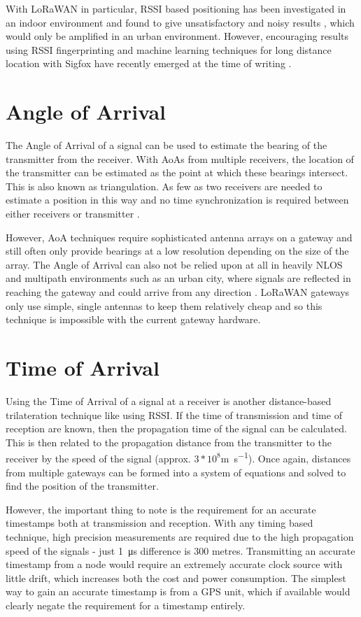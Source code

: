 \documentclass[a4paper]{report}
\begin{document}
    With LoRaWAN in particular, RSSI based positioning has been investigated in an indoor environment and found to give unsatisfactory and noisy results \cite{Henriksson2016}, which would only be amplified in an urban environment. However, encouraging results using RSSI fingerprinting and machine learning techniques for long distance location with Sigfox have recently emerged at the time of writing \cite{Sallouha2017}.

  \section{Angle of Arrival}
    The Angle of Arrival of a signal can be used to estimate the bearing of the transmitter from the receiver. With AoAs from multiple receivers, the location of the transmitter can be estimated as the point at which these bearings intersect. This is also known as triangulation. As few as two receivers are needed to estimate a position in this way and no time synchronization is required between either receivers or transmitter \cite{Krizmant1997}.

    However, AoA techniques require sophisticated antenna arrays on a gateway and still often only provide bearings at a low resolution depending on the size of the array. The Angle of Arrival can also not be relied upon at all in heavily NLOS and multipath environments such as an urban city, where signals are reflected in reaching the gateway and could arrive from any direction \cite{Zimmerman2012}. LoRaWAN gateways only use simple, single antennas to keep them relatively cheap and so this technique is impossible with the current gateway hardware.

  \section{Time of Arrival}
    Using the Time of Arrival of a signal at a receiver is another distance-based trilateration technique like using RSSI. If the time of transmission and time of reception are known, then the propagation time of the signal can be calculated. This is then related to the propagation distance from the transmitter to the receiver by the speed of the signal (approx. \(3*10^8\)\si{\metre\per\second}). Once again, distances from multiple gateways can be formed into a system of equations and solved to find the position of the transmitter.

    However, the important thing to note is the requirement for an accurate timestamps both at transmission and reception. With any timing based technique, high precision measurements are required due to the high propagation speed of the signals - just \SI{1}{\micro\second} difference is 300 metres. Transmitting an accurate timestamp from a node would require an extremely accurate clock source with little drift, which increases both the cost and power consumption. The simplest way to gain an accurate timestamp is from a GPS unit, which if available would clearly negate the requirement for a timestamp entirely.
\end{document}
